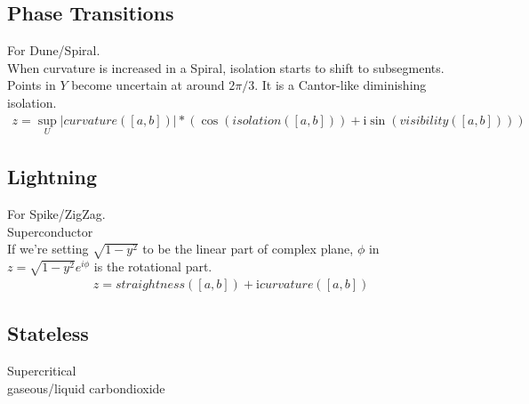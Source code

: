 \documentclass{report}
\begin{document}
\subsection{Phase Transitions}
For Dune/Spiral.\\
When curvature is increased in a Spiral, isolation starts to shift to subsegments. Points in $Y$ become uncertain at around $2\pi/3$. It is a Cantor-like diminishing isolation.
\begin{align}
z =  \sup_{U}\lvert curvature([a,b]) \rvert*(\cos{(isolation([a,b]))} +\mathrm{i} \sin{(visibility([a,b]))})
\end{align}

\subsection{Lightning}
For Spike/ZigZag.\\
Superconductor\\
If we're setting $\sqrt{1-y^2}$ to be the linear part of complex plane, $\phi$ in $z=\sqrt{1-y^2}e^{i\phi}$ is the rotational part.
\begin{align}
z =  straightness([a,b]) + \mathrm{i} curvature([a,b])
\end{align}

\subsection{Stateless}
Supercritical\\
gaseous/liquid carbondioxide

\printbibliography
\end{document}
